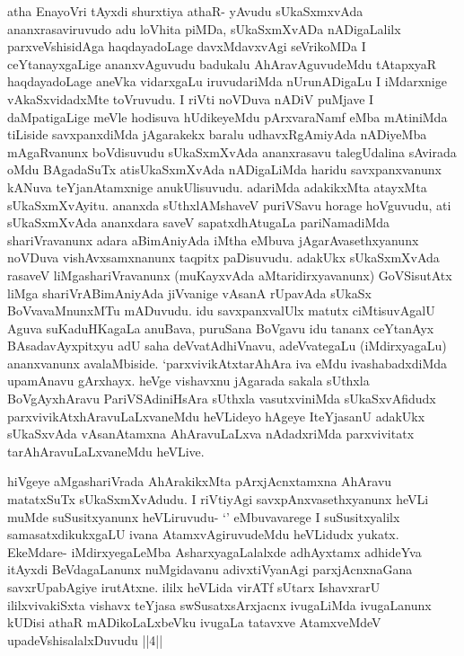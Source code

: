\begin{artha}
atha EnayoVri tAyxdi shurxtiya athaR- yAvudu sUkaSxmxvAda ananxrasaviruvudo adu loVhita piMDa, sUkaSxmXvADa nADigaLalilx parxveVshisidAga haqdayadoLage davxMdavxvAgi seVrikoMDa I ceYtanayxgaLige ananxvAguvudu badukalu AhAravAguvudeMdu tAtapxyaR haqdayadoLage aneVka vidarxgaLu iruvudariMda nUrunADigaLu I iMdarxnige vAkaSxvidadxMte toVruvudu. I riVti noVDuva nADiV puMjave I daMpatigaLige meVle hodisuva hUdikeyeMdu pArxvaraNamf eMba mAtiniMda tiLiside savxpanxdiMda jAgarakekx baralu udhavxRgAmiyAda nADiyeMba mAgaRvanunx boVdisuvudu sUkaSxmXvAda ananxrasavu talegUdalina sAvirada oMdu BAgadaSuTx atisUkaSxmXvAda nADigaLiMda haridu savxpanxvanunx kANuva teYjanAtamxnige anukUlisuvudu. adariMda adakikxMta atayxMta sUkaSxmXvAyitu. ananxda sUthxlAMshaveV puriVSavu horage hoVguvudu, ati sUkaSxmXvAda ananxdara saveV sapatxdhAtugaLa pariNamadiMda shariVravanunx adara aBimAniyAda iMtha eMbuva jAgarAvasethxyanunx noVDuva vishAvxsamxnanunx taqpitx paDisuvudu. adakUkx sUkaSxmXvAda rasaveV liMgashariVravanunx (muKayxvAda aMtaridirxyavanunx) GoVSisutAtx liMga shariVrABimAniyAda jiVvanige vAsanA rUpavAda sUkaSx BoVvavaMnunxMTu mADuvudu. idu savxpanxvalUlx matutx ciMtisuvAgalU Aguva suKaduHKagaLa anuBava, puruSana BoVgavu idu tananx ceYtanAyx BAsadavAyxpitxyu adU saha deVvatAdhiVnavu, adeVvategaLu (iMdirxyagaLu) ananxvanunx avalaMbiside. `parxvivikAtxtarAhAra iva eMdu ivashabadxdiMda upamAnavu gArxhayx. heVge vishavxnu jAgarada sakala sUthxla BoVgAyxhAravu PariVSAdiniHsAra sUthxla vasutxviniMda sUkaSxvAfidudx parxvivikAtxhAravuLaLxvaneMdu heVLideyo hAgeye IteYjasanU adakUkx sUkaSxvAda vAsanAtamxna AhAravuLaLxva nAdadxriMda parxvivitatx tarAhAravuLaLxvaneMdu heVLive.
\end{artha}

\begin{artha}
hiVgeye aMgashariVrada AhArakikxMta pArxjAcnxtamxna AhAravu matatxSuTx sUkaSxmXvAdudu. I riVtiyAgi savxpAnxvasethxyanunx heVLi muMde suSusitxyanunx heVLiruvudu- `\stext ' eMbuvavarege I suSusitxyalilx samasatxdikukxgaLU ivana AtamxvAgiruvudeMdu heVLidudx yukatx. EkeMdare- iMdirxyegaLeMba AsharxyagaLalalxde adhAyxtamx adhideYva itAyxdi BeVdagaLanunx nuMgidavanu adivxtiVyanAgi parxjAcnxnaGana savxrUpabAgiye irutAtxne. ililx heVLida virATf sUtarx IshavxrarU ililxvivakiSxta vishavx teYjasa swSusatxsArxjacnx ivugaLiMda ivugaLanunx kUDisi athaR mADikoLaLxbeVku ivugaLa tatavxve AtamxveMdeV upadeVshisalalxDuvudu \stext ||4|| 
\end{artha}

